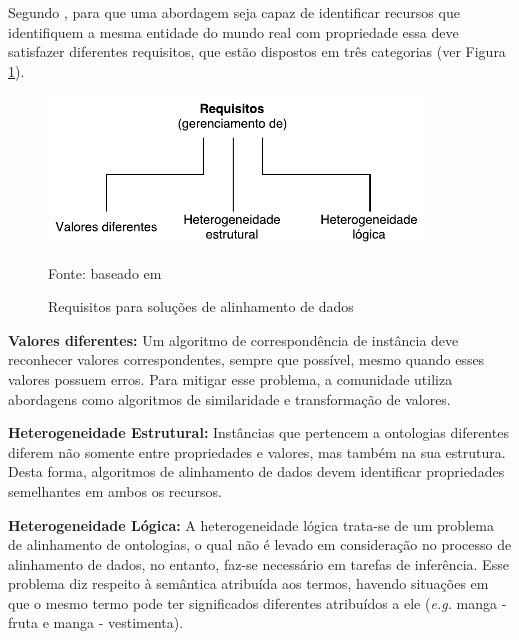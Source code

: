 Segundo , para que uma abordagem seja capaz de identificar recursos que identifiquem a mesma entidade do mundo real com propriedade essa deve satisfazer diferentes requisitos, que estão  dispostos em três categorias (ver Figura \ref{fig:imrequirements}).

\begin{figure}[!ht]
	\centering
	\includegraphics[width=0.9\textwidth]{./imagens/im_requirements.pdf}
    \caption{Requisitos para soluções de alinhamento de dados}
	\footnotesize{Fonte: baseado em \cite{ferrara2008towards}}
	\label{fig:imrequirements}
\end{figure}

\textbf{Valores diferentes:}
% 
% 
%
%
Um algoritmo de correspondência de instância deve reconhecer valores correspondentes, sempre que possível, mesmo quando esses valores possuem erros. Para mitigar esse problema, a comunidade utiliza abordagens como algoritmos de similaridade e transformação de valores.


\textbf{Heterogeneidade Estrutural:}
Instâncias que pertencem a ontologias diferentes diferem não somente entre propriedades e valores, mas também na sua estrutura. Desta forma, algoritmos de alinhamento de dados devem identificar propriedades semelhantes em ambos os recursos.


\textbf{Heterogeneidade Lógica:}
% 
% 
%
%
A heterogeneidade lógica trata-se de um problema de alinhamento de ontologias, o qual não é levado em consideração no processo de alinhamento de dados, no entanto, faz-se necessário em tarefas de inferência. Esse problema diz respeito à semântica atribuída aos termos, havendo situações em que o mesmo termo pode ter significados diferentes atribuídos a ele (\textit{e.g.} manga - fruta e manga - vestimenta).

